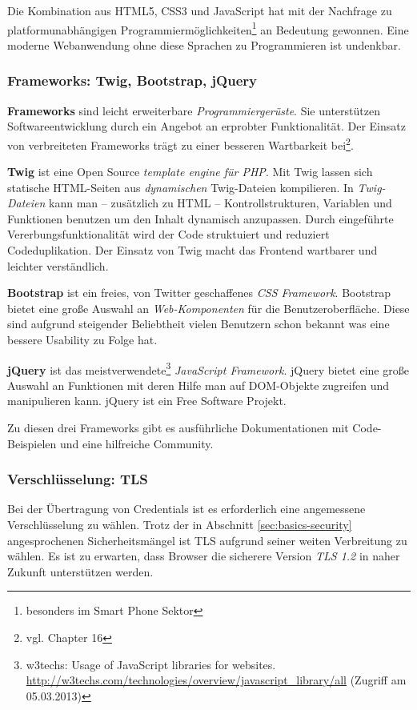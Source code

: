 \documentclass[12pt,a4paper,pointednumbers,abstracton]{scrartcl}
\begin{document}
Die Kombination aus HTML5, CSS3 und JavaScript hat mit der Nachfrage zu platformunabhängigen Programmiermöglichkeiten\footnote{besonders im Smart Phone Sektor} an Bedeutung gewonnen.
Eine moderne Webanwendung ohne diese Sprachen zu Programmieren ist undenkbar.

\subsubsection{Frameworks: Twig, Bootstrap, jQuery}

\textbf{Frameworks} sind leicht erweiterbare \emph{Programmiergerüste}.
Sie unterstützen Softwareentwicklung durch ein Angebot an erprobter Funktionalität.
Der Einsatz von verbreiteten Frameworks trägt zu einer besseren Wartbarkeit bei\footnote{vgl. \cite{Som2010} Chapter 16}.

\textbf{Twig} ist eine Open Source \emph{template engine für PHP}.
Mit Twig lassen sich statische HTML-Seiten aus \emph{dynamischen} Twig-Dateien kompilieren.
In \emph{Twig-Dateien} kann man -- zusätzlich zu HTML -- Kontrollstrukturen, Variablen und Funktionen benutzen um den Inhalt dynamisch anzupassen.
Durch eingeführte Vererbungsfunktionalität wird der Code struktuiert und reduziert Codeduplikation.
Der Einsatz von Twig macht das Frontend wartbarer und leichter verständlich.

\textbf{Bootstrap} ist ein freies, von Twitter geschaffenes \emph{CSS Framework}.
Bootstrap bietet eine große Auswahl an \emph{Web-Komponenten} für die Benutzeroberfläche.
Diese sind aufgrund steigender Beliebtheit vielen Benutzern schon bekannt was eine bessere Usability zu Folge hat.

\textbf{jQuery} ist das meistverwendete\footnote{w3techs: Usage of JavaScript libraries for websites. \url{http://w3techs.com/technologies/overview/javascript_library/all} (Zugriff am 05.03.2013)} \emph{JavaScript Framework}.
jQuery bietet eine große Auswahl an Funktionen mit deren Hilfe man auf DOM-Objekte zugreifen und manipulieren kann.
jQuery ist ein Free Software Projekt.

Zu diesen drei Frameworks gibt es ausführliche Dokumentationen mit Code-Beispielen und eine hilfreiche Community.

\subsubsection{Verschlüsselung: TLS}
\label{sec:oauth-infrz/tls}

Bei der Übertragung von Credentials ist es erforderlich eine angemessene Verschlüsselung zu wählen.
Trotz der in Abschnitt \ref{sec:basics-security} angesprochenen Sicherheitsmängel ist TLS aufgrund seiner weiten Verbreitung zu wählen.
Es ist zu erwarten, dass Browser die sicherere Version \emph{TLS 1.2} in naher Zukunft unterstützen werden.
\end{document}
